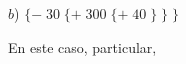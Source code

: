 \vspace*{0.5cm}
$b$) $\{-\; 30\; \{+\; 300\; \{+\; 40\; \}\; \}\; \}$

\hspace*{0.3cm} En este caso, particular,
